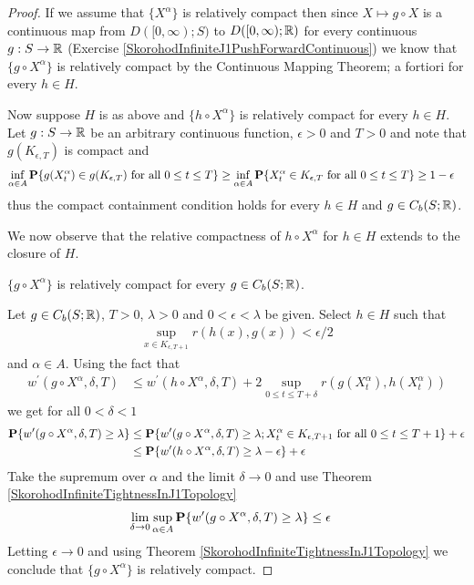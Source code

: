 \begin{proof}
If we assume that $\lbrace X^\alpha \rbrace$ is relatively compact then since $X \mapsto g \circ X$ is a continuous map 
from $D([0,\infty); S)$ to $D([0,\infty); \mathbb{R})$ for every continuous $g : S \to \mathbb{R}$ (Exercise \ref{SkorohodInfiniteJ1PushForwardContinuous})
we know that $\lbrace g \circ X^\alpha \rbrace$ is relatively compact by the Continuous Mapping Theorem; a fortiori for every $h \in H$.

Now suppose $H$ is as above and $\lbrace h \circ X^\alpha \rbrace$ is relatively compact
for every $h \in H$.  Let $g : S \to \mathbb{R}$ be an arbitrary continuous function, $\epsilon > 0$ and $T > 0$ and note that
$g(K_{\epsilon, T})$ is compact and 
\begin{align*}
\inf_{\alpha \in A} \textbf{P}\{g(X^\alpha_t) \in g(K_{\epsilon,T}) \text{ for all } 0 \leq t \leq T\} &\geq 
\inf_{\alpha \in A} \textbf{P}\{X^\alpha_t \in K_{\epsilon,T} \text{ for all } 0 \leq t \leq T\} 
\geq 1 - \epsilon
\end{align*}
thus the compact containment condition holds for every $h \in H$ and $g \in C_b(S; \mathbb{R})$.

We now observe that the relative compactness of $h \circ X^\alpha$ for $h \in H$ extends to the closure of $H$.
\begin{clm} $\lbrace g \circ X^\alpha \rbrace$ is relatively compact
for every $g \in C_b(S; \mathbb{R})$.  
\end{clm}
Let $g \in  C_b(S; \mathbb{R})$, $T > 0$, $\lambda > 0$ and $0 < \epsilon < \lambda$ be given.  Select $h \in H$ such that
\begin{align*}
\sup_{x \in K_{\epsilon, T+1}} r(h(x), g(x)) < \epsilon/2
\end{align*}
and $\alpha \in A$.   Using the fact that 
\begin{align*}
w^{\prime}(g \circ X^\alpha, \delta, T) &\leq w^{\prime}(h \circ X^\alpha, \delta, T) + 2 \sup_{0 \leq t \leq T+\delta} r(g(X^\alpha_t), h(X^\alpha_t))
\end{align*}
we get for all $0 < \delta < 1$
\begin{align*}
\textbf{P}\{w^\prime(g \circ X^\alpha, \delta, T) \geq \lambda\} &\leq
\textbf{P}\{w^\prime(g \circ X^\alpha, \delta, T) \geq \lambda ; X^\alpha_t \in K_{\epsilon,T+1} \text{ for all } 0 \leq t \leq T+1\} + \epsilon \\
&\leq \textbf{P}\{w^\prime(h \circ X^\alpha, \delta, T) \geq \lambda-\epsilon\} + \epsilon 
\end{align*}
Take the supremum over $\alpha$ and the limit $\delta \to 0$ and use Theorem \ref{SkorohodInfiniteTightnessInJ1Topology}
\begin{align*}
\lim_{\delta \to 0} \sup_{\alpha \in A} \textbf{P}\{w^\prime(g \circ X^\alpha, \delta, T) \geq \lambda\} &\leq \epsilon
\end{align*}
Letting $\epsilon \to 0$ and using Theorem \ref{SkorohodInfiniteTightnessInJ1Topology} we conclude that $\lbrace g \circ X^\alpha \rbrace$ is
relatively compact.


\end{proof}
